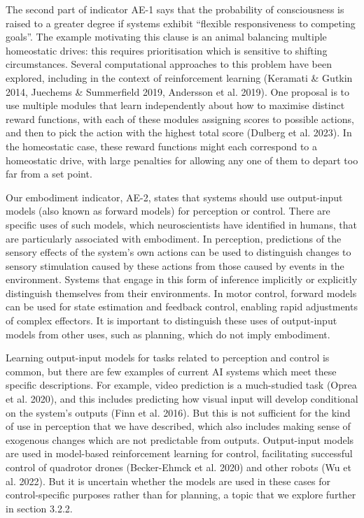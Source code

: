 \documentclass[12pt]{article}
\begin{document}
The second part of indicator AE-1 says that the probability of consciousness is raised to a greater degree if systems exhibit ``flexible responsiveness to competing goals''. The example motivating this clause is an animal balancing multiple homeostatic drives: this requires prioritisation which is sensitive to shifting circumstances. Several computational approaches to this problem have been explored, including in the context of reinforcement learning (Keramati \& Gutkin 2014, Juechems \& Summerfield 2019, Andersson et al. 2019). One proposal is to use multiple modules that learn independently about how to maximise distinct reward functions, with each of these modules assigning scores to possible actions, and then to pick the action with the highest total score (Dulberg et al. 2023). In the homeostatic case, these reward functions might each correspond to a homeostatic drive, with large penalties for allowing any one of them to depart too far from a set point.

Our embodiment indicator, AE-2, states that systems should use output-input models (also known as forward models) for perception or control. There are specific uses of such models, which neuroscientists have identified in humans, that are particularly associated with embodiment. In perception, predictions of the sensory effects of the system’s own actions can be used to distinguish changes to sensory stimulation caused by these actions from those caused by events in the environment. Systems that engage in this form of inference implicitly or explicitly distinguish themselves from their environments. In motor control, forward models can be used for state estimation and feedback control, enabling rapid adjustments of complex effectors. It is important to distinguish these uses of output-input models from other uses, such as planning, which do not imply embodiment.

Learning output-input models for tasks related to perception and control is common, but there are few examples of current AI systems which meet these specific descriptions. For example, video prediction is a much-studied task (Oprea et al. 2020), and this includes predicting how visual input will develop conditional on the system’s outputs (Finn et al. 2016). But this is not sufficient for the kind of use in perception that we have described, which also includes making sense of exogenous changes which are not predictable from outputs. Output-input models are used in model-based reinforcement learning for control, facilitating successful control of quadrotor drones (Becker-Ehmck et al. 2020) and other robots (Wu et al. 2022). But it is uncertain whether the models are used in these cases for control-specific purposes rather than for planning, a topic that we explore further in section 3.2.2.
\end{document}
